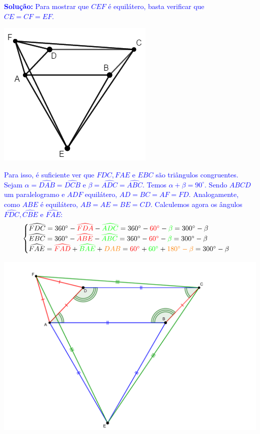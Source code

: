 \documentclass[oneside,a4paper,12pt]{article}
\theoremstyle{Colorido}
\theoremstyle{solu}
\theoremstyle{dotlessP}
\newcommand{\solucao}[1]{\textcolor{blue}{\textbf{Solução:} #1}}
\begin{document}
\solucao{Para mostrar que $CEF$ é equilátero, basta verificar que $CE = CF = EF.$ }
\begin{center}
\includegraphics[scale=1.1]{Provas e Avaliações/Figuras avaliações/8avaliacaociclo3.png}
\end{center}
\textcolor{blue}{Para isso, é suficiente ver que $FDC, FAE$ e $EBC$ são triângulos congruentes. Sejam $\alpha = \widehat{DAB} = \widehat{DCB}$ e $\beta = \widehat{ADC} = \widehat{ABC}.$ Temos $\alpha + \beta = 90^\circ.$ Sendo $ABCD$ um paralelogramo e $ADF$ equilátero, $AD = BC = AF = FD.$ Analogamente, como $ABE$ é equilátero, $AB = AE = BE = CD.$
Calculemos agora os ângulos $\widehat{FDC}, \widehat{CBE}$ e $\widehat{FAE}:$
\[\begin{cases}
\widehat{FDC} = 360^\circ - \textcolor{red}{\widehat{FDA}} - \textcolor{green}{\widehat{ADC}} = 360^\circ  - \textcolor{red}{60^\circ} - \textcolor{green}{\beta} = 300^\circ - \beta \\
\widehat{EBC} = 360^\circ - \textcolor{red}{\widehat{ABE}} - \textcolor{green}{\widehat{ABC}} = 360^\circ  - \textcolor{red}{60^\circ} - \textcolor{green}{\beta} = 300^\circ - \beta\\
\widehat{FAE} = \textcolor{red}{\widehat{FAD}} + \textcolor{green}{\widehat{BAE}} + \textcolor{orange}{DAB} =  \textcolor{red}{60^\circ} + \textcolor{green}{60^\circ} + \textcolor{orange}{180^\circ - \beta} = 300^\circ - \beta
\end{cases}\]}
\begin{center}
\includegraphics[scale=5.6]{Provas e Avaliações/Figuras avaliações/9avaliacaociclo3.png}
\end{center}
\end{document}
